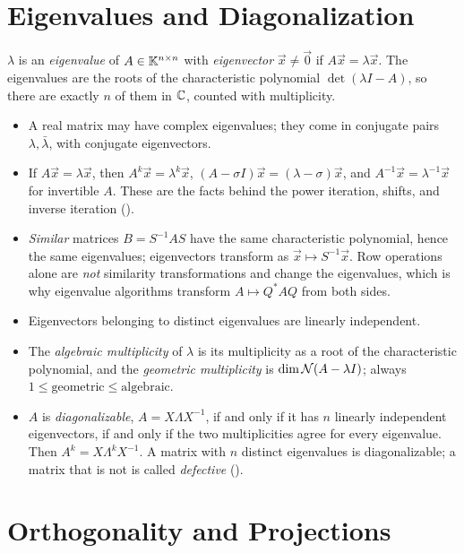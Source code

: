 \section{Eigenvalues and Diagonalization}
\label{sec:eig-basics}

$\lambda$ is an \emph{eigenvalue} of $A \in \mathbb{K}^{n \times n}$ with \emph{eigenvector} $\vec{x} \ne \vec{0}$ if $A\vec{x} = \lambda\vec{x}$. The eigenvalues are the roots of the characteristic polynomial $\det(\lambda I - A)$, so there are exactly $n$ of them in $\mathbb{C}$, counted with multiplicity.
\begin{itemize}
  \item A real matrix may have complex eigenvalues; they come in conjugate pairs $\lambda, \bar{\lambda}$, with conjugate eigenvectors.
  \item If $A\vec{x} = \lambda\vec{x}$, then $A^k\vec{x} = \lambda^k\vec{x}$, $(A - \sigma I)\vec{x} = (\lambda - \sigma)\vec{x}$, and $A^{-1}\vec{x} = \lambda^{-1}\vec{x}$ for invertible $A$. These are the facts behind the power iteration, shifts, and inverse iteration ().
  \item \emph{Similar} matrices $B = S^{-1}AS$ have the same characteristic polynomial, hence the same eigenvalues; eigenvectors transform as $\vec{x} \mapsto S^{-1}\vec{x}$. Row operations alone are \emph{not} similarity transformations and change the eigenvalues, which is why eigenvalue algorithms transform $A \mapsto Q^\ast AQ$ from both sides.
  \item Eigenvectors belonging to distinct eigenvalues are linearly independent.
  \item The \emph{algebraic multiplicity} of $\lambda$ is its multiplicity as a root of the characteristic polynomial, and the \emph{geometric multiplicity} is $\dim\mathcal{N}(A - \lambda I)$; always $1 \le \text{geometric} \le \text{algebraic}$.
  \item $A$ is \emph{diagonalizable}, $A = X\Lambda X^{-1}$, if and only if it has $n$ linearly independent eigenvectors, if and only if the two multiplicities agree for every eigenvalue. Then $A^k = X\Lambda^k X^{-1}$. A matrix with $n$ distinct eigenvalues is diagonalizable; a matrix that is not is called \emph{defective} ().
\end{itemize}

\section{Orthogonality and Projections}
\label{sec:orth-basics}

